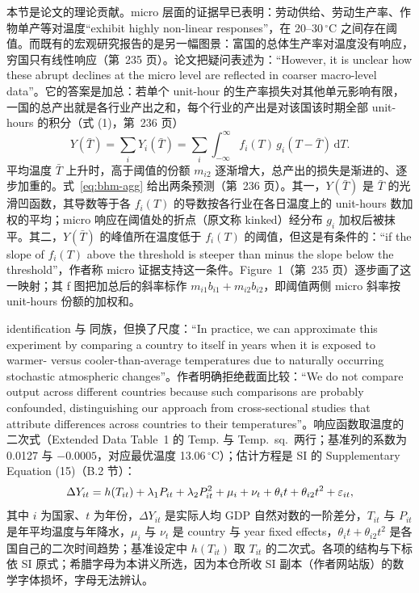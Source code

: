 本节是论文的理论贡献。micro 层面的证据早已表明：劳动供给、劳动生产率、作物单产等对温度``exhibit highly non-linear responses''\citep[第~235 页]{burke2015global}，在 20--30\,$^\circ$C 之间存在阈值。而既有的宏观研究报告的是另一幅图景：富国的总体生产率对温度没有响应，穷国只有线性响应（第~235 页）。论文把疑问表述为：``However, it is unclear how these abrupt declines at the micro level are reflected in coarser macro-level data''\citep[第~235--236 页]{burke2015global}。它的答案是加总：若单个 unit-hour 的生产率损失对其他单元影响有限，一国的总产出就是各行业产出之和，每个行业的产出是对该国该时期全部 unit-hours 的积分（式 (1)，第~236 页）
\begin{equation}
Y(\bar{T}) = \sum_i Y_i(\bar{T}) = \sum_i \int_{-\infty}^{\infty} f_i(T)\, g_i(T-\bar{T})\,\mathrm{d}T .
\label{eq:bhm-agg}
\end{equation}
平均温度 $\bar{T}$ 上升时，高于阈值的份额 $m_{i2}$ 逐渐增大，总产出的损失是渐进的、逐步加重的。式~\ref{eq:bhm-agg} 给出两条预测（第~236 页）。其一，$Y(\bar T)$ 是 $\bar{T}$ 的光滑凹函数，其导数等于各 $f_i(T)$ 的导数按各行业在各日温度上的 unit-hours 数加权的平均；micro 响应在阈值处的折点（原文称 kinked）经分布 $g_i$ 加权后被抹平。其二，$Y(\bar T)$ 的峰值所在温度低于 $f_i(T)$ 的阈值，但这是有条件的：``if the slope of $f_i(T)$ above the threshold is steeper than minus the slope below the threshold''\citep[第~236 页]{burke2015global}，作者称 micro 证据支持这一条件。Figure~1（第~235 页）逐步画了这一映射；其 f 图把加总后的斜率标作 $m_{i1}b_{i1}+m_{i2}b_{i2}$，即阈值两侧 micro 斜率按 unit-hours 份额的加权和。

identification 与  同族，但换了尺度：``In practice, we can approximate this experiment by comparing a country to itself in years when it is exposed to warmer- versus cooler-than-average temperatures due to naturally occurring stochastic atmospheric changes''\citep[第~236 页]{burke2015global}。作者明确拒绝截面比较：``We do not compare output across different countries because such comparisons are probably confounded, distinguishing our approach from cross-sectional studies that attribute differences across countries to their temperatures''\citep[第~236 页]{burke2015global}。响应函数取温度的二次式（Extended Data Table~1 的 Temp. 与 Temp.\ sq.\ 两行；基准列的系数为 0.0127 与 $-0.0005$，对应最优温度 13.06\,$^\circ$C）；估计方程是 SI 的 Supplementary Equation (15)（B.2 节）：
\begin{equation}
\Delta Y_{it} = h(T_{it}) + \lambda_1 P_{it} + \lambda_2 P_{it}^2 + \mu_i + \nu_t + \theta_i t + \theta_{i2} t^2 + \varepsilon_{it},
\label{eq:bhm-reg}
\end{equation}
其中 $i$ 为国家、$t$ 为年份，$\Delta Y_{it}$ 是实际人均 GDP 自然对数的一阶差分，$T_{it}$ 与 $P_{it}$ 是年平均温度与年降水，$\mu_i$ 与 $\nu_t$ 是 country 与 year fixed effects，$\theta_i t+\theta_{i2}t^2$ 是各国自己的二次时间趋势；基准设定中 $h(T_{it})$ 取 $T_{it}$ 的二次式。各项的结构与下标依 SI 原式；希腊字母为本讲义所选，因为本仓所收 SI 副本（作者网站版）的数学字体损坏，字母无法辨认。

